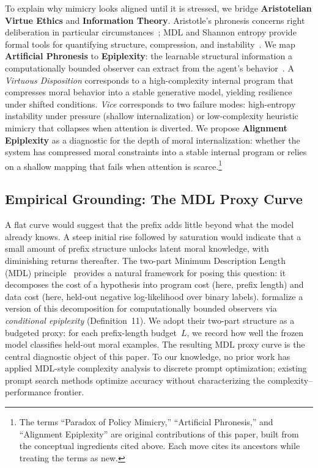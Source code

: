 \documentclass[preprint]{article}
\begin{document}
To explain why mimicry looks aligned until it is stressed, we bridge \textbf{Aristotelian Virtue Ethics} and \textbf{Information Theory}. Aristotle's phronesis concerns right deliberation in particular circumstances~\citep{aristotle_ne}; MDL and Shannon entropy provide formal tools for quantifying structure, compression, and instability~\citep{shannon1948, sep_information, grunwald2007mdl}.
We map \textbf{Artificial Phronesis} to \textbf{Epiplexity}: the learnable structural information a computationally bounded observer can extract from the agent's behavior~\citep{finzi2026epiplexity}.
A \emph{Virtuous Disposition} corresponds to a high-complexity internal program that compresses moral behavior into a stable generative model, yielding resilience under shifted conditions.
\emph{Vice} corresponds to two failure modes: high-entropy instability under pressure (shallow internalization) or low-complexity heuristic mimicry that collapses when attention is diverted.
We propose \textbf{Alignment Epiplexity} as a diagnostic for the depth of moral internalization: whether the system has compressed moral constraints into a stable internal program or relies on a shallow mapping that fails when attention is scarce.\footnote{The terms ``Paradox of Policy Mimicry,'' ``Artificial Phronesis,'' and ``Alignment Epiplexity'' are original contributions of this paper, built from the conceptual ingredients cited above. Each move cites its ancestors while treating the terms as new.}

\subsection{Empirical Grounding: The MDL Proxy Curve}
\label{sec:intro_mdl}

A flat curve would suggest that the prefix adds little beyond what the model already knows.
A steep initial rise followed by saturation would indicate that a small amount of prefix structure unlocks latent moral knowledge, with diminishing returns thereafter.
The two-part Minimum Description Length (MDL) principle~\citep{rissanen2004mdl, grunwald2007mdl} provides a natural framework for posing this question: it decomposes the cost of a hypothesis into program cost (here, prefix length) and data cost (here, held-out negative log-likelihood over binary labels).
\citet{finzi2026epiplexity} formalize a version of this decomposition for computationally bounded observers via \emph{conditional epiplexity} (Definition~11).
We adopt their two-part structure as a budgeted proxy: for each prefix-length budget~$L$, we record how well the frozen model classifies held-out moral examples.
The resulting MDL proxy curve is the central diagnostic object of this paper.
To our knowledge, no prior work has applied MDL-style complexity analysis to discrete prompt optimization; existing prompt search methods optimize accuracy without characterizing the complexity--performance frontier.
\end{document}
